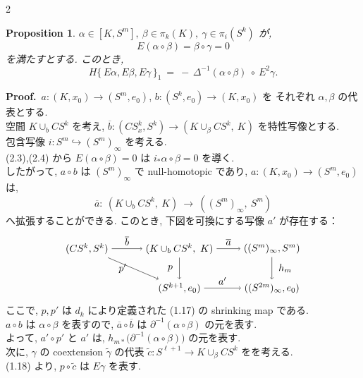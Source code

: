 \documentclass[10pt, leqno]{ltjsarticle} %
\newcommand{\into}{\hookrightarrow}
\newcommand{\todai}[2][]{\{\,#2\,\}_{#1}}      %
\newcommand{\coext}[1]{\widetilde{#1}}  %
\numberwithin{equation}{section}
\theoremstyle{plain}
\newtheorem{proposition}[theorem]{Proposition}
\theoremstyle{definition}
\theoremstyle{remark}
\begin{document}
\begin{paracol}{2}


\begin{proposition}\label{prop:2.6}
$\alpha\in[K, S^m], \ \beta\in\pi_k(K), \ \gamma\in\pi_i(S^k)$ が,
\[
E(\alpha\circ\beta)=\beta\circ\gamma=0
\]
を満たすとする. このとき, 
\[
H\todai[1]{E\alpha,E\beta,E\gamma}\ =\ -\,\Delta^{-1}(\alpha\circ\beta)\ \circ\ E^2\gamma .
\]
\end{proposition}

\noindent
\textbf{Proof.}\
$a:(K,x_0)\to(S^m,e_0)$, $b:(S^k,e_0)\to(K,x_0)$ を
それぞれ $\alpha,\beta$ の代表とする. \\
空間 $K\cup_{b} CS^k$ を考え, 
$\overline{b}:(CS^k_x,S^k)\to(K\cup_{\beta}CS^k,\ K)$ を特性写像とする. \\
包含写像 $i:S^m\into (S^m)_\infty$ を考える. \\
(2.3),(2.4) から $E(\alpha\circ\beta)=0$ は $i_*\alpha\circ\beta=0$ を導く. \\
したがって, $a\circ b$ は $(S^m)_\infty$ で null-homotopic であり, 
$a:(K,x_0)\to(S^m,e_0)$ は,
\[
\overline{a}:\ (K\cup_{b}CS^k,\ K)\ \longrightarrow\ ((S^m)_\infty,\ S^m)
\]
へ拡張することができる. 
このとき, 下図を可換にする写像 $a'$ が存在する：
\[
\begin{tikzpicture}[baseline=(current bounding box.center)]
  \node (A) at (0,1.4) {$(CS^k,S^k)$};
  \node (B) at (3.3,1.4) {$(K\cup_{b}CS^k,\ K)$};
  \node (C) at (6.6,1.4) {$((S^m)_\infty,S^m)$};
  \node (D) at (3.3,0)   {$(S^{k+1},e_0)$};
  \node (E) at (6.6,0)   {$((S^{2m})_\infty,e_0)$};
  \draw[->] (A)--node[above] {$\ \overline{b}\ $}(B);
  \draw[->] (B)--node[above] {$\ \overline{a}\ $}(C);
  \draw[->] (A)--node[left] {$\ p'\ $}(D);
  \draw[->] (B)--node[left] {$\ p\ $}(D);
  \draw[->] (D)--node[above] {$\ a'\ $}(E);
  \draw[->] (C)--node[right] {$\ h_m\ $}(E);
\end{tikzpicture}
\]
ここで, $p,p'$ は \(d_k\) により定義された (1.17) の shrinking map である. \\
$a\circ b$ は $\alpha\circ\beta$ を表すので, 
$\overline{a}\circ\overline{b}$ は $\partial^{-1}(\alpha\circ\beta)$ の元を表す. \\
よって, $a'\circ p'$ と $a'$ は, 
$h_{m*}\!\bigl(\partial^{-1}(\alpha\circ\beta)\bigr)$ の元を表す. \\
次に, $\gamma$ の coextension \(\coext{\gamma}\) の代表
$\widetilde{c}:S^{\ell+1}\to K\cup_{\beta}CS^k$ をを考える. \\
(1.18) より, $p\circ\widetilde{c}$ は $E\gamma$ を表す. \\

\end{paracol}
\end{document}
